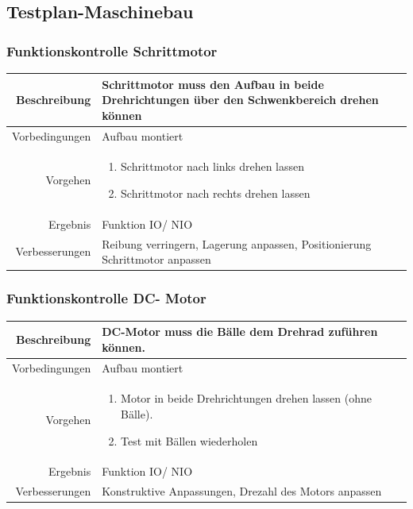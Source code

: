 \subsection{Testplan-Maschinebau}
\subsubsection{Funktionskontrolle Schrittmotor}
\begin{table}[h!]
	\renewcommand{\arraystretch}{1.5}
	\begin{tabular}{|r|p{14cm}|}
		\hline Beschreibung & Schrittmotor muss den Aufbau in beide Drehrichtungen über den Schwenkbereich drehen können  \\ 
		\hline Vorbedingungen & Aufbau montiert \\ 
		\hline Vorgehen & 
		\begin{enumerate}
			\item Schrittmotor nach links drehen lassen 
			\item Schrittmotor nach rechts drehen lassen
		\end{enumerate} \\ 
		\hline Ergebnis & Funktion IO/ NIO \\ 
		\hline Verbesserungen & Reibung verringern, Lagerung anpassen, Positionierung Schrittmotor anpassen \\ 
		\hline 
	\end{tabular}
\end{table}

\subsubsection{Funktionskontrolle DC- Motor}
\begin{table}[h!]
	\renewcommand{\arraystretch}{1.5}
	\begin{tabular}{|r|p{14cm}|}
		\hline Beschreibung & DC-Motor muss die Bälle dem Drehrad zuführen können.  \\ 
		\hline Vorbedingungen & Aufbau montiert \\ 
		\hline Vorgehen & 
		\begin{enumerate}
			\item Motor in beide Drehrichtungen drehen lassen (ohne Bälle). 
			\item Test mit Bällen wiederholen
		\end{enumerate} \\ 
		\hline Ergebnis & Funktion IO/ NIO \\ 
		\hline Verbesserungen & Konstruktive Anpassungen, Drezahl des Motors anpassen \\ 
		\hline 
	\end{tabular}
\end{table}

